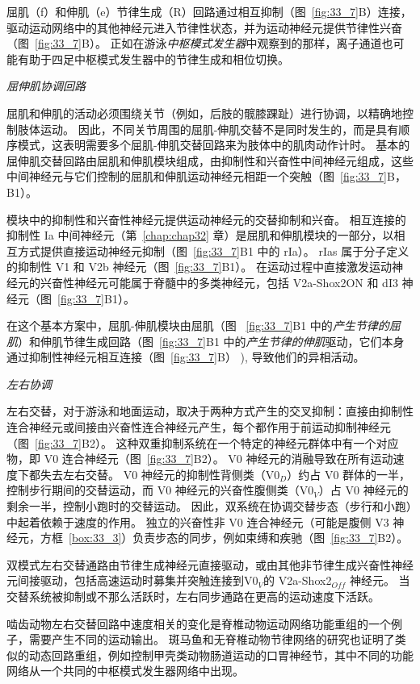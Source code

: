 屈肌（f）和伸肌（e）节律生成（R）回路通过相互抑制（图~\ref{fig:33_7}B）连接，驱动运动网络中的其他神经元进入节律性状态，并为运动神经元提供节律性兴奋（图~\ref{fig:33_7}B）。
正如在游泳\textit{中枢模式发生器}中观察到的那样，离子通道也可能有助于四足中枢模式发生器中的节律生成和相位切换。


\textit{屈伸肌协调回路}

屈肌和伸肌的活动必须围绕关节（例如，后肢的髋膝踝趾）进行协调，以精确地控制肢体运动。
因此，不同关节周围的屈肌-伸肌交替不是同时发生的，而是具有顺序模式，这表明需要多个屈肌-伸肌交替回路来为肢体中的肌肉动作计时。
基本的屈伸肌交替回路由屈肌和伸肌模块组成，由抑制性和兴奋性中间神经元组成，这些中间神经元与它们控制的屈肌和伸肌运动神经元相距一个突触（图~\ref{fig:33_7}B，B1）。


模块中的抑制性和兴奋性神经元提供运动神经元的交替抑制和兴奋。
相互连接的抑制性 Ia 中间神经元（第~\ref{chap:chap32} 章）是屈肌和伸肌模块的一部分，以相互方式提供直接运动神经元抑制（图~\ref{fig:33_7}B1 中的 rIa）。
rIas 属于分子定义的抑制性 V1 和 V2b 神经元（图~\ref{fig:33_7}B1）。
在运动过程中直接激发运动神经元的兴奋性神经元可能属于脊髓中的多类神经元，包括 V2a-Shox2ON 和 dI3 神经元（图~\ref{fig:33_7}B1）。


在这个基本方案中，屈肌-伸肌模块由屈肌（图 ~\ref{fig:33_7}B1 中的\textit{产生节律的屈肌}）和伸肌节律生成回路（图~\ref{fig:33_7}B1 中的\textit{产生节律的伸肌}驱动，它们本身通过抑制性神经元相互连接（图~\ref{fig:33_7}B） ), 导致他们的异相活动。


\textit{左右协调}

左右交替，对于游泳和地面运动，取决于两种方式产生的交叉抑制：直接由抑制性连合神经元或间接由兴奋性连合神经元产生，每个都作用于前运动抑制神经元（图~\ref{fig:33_7}B2）。
这种双重抑制系统在一个特定的神经元群体中有一个对应物，即 V0 连合神经元（图~\ref{fig:33_7}B2）。
V0 神经元的消融导致在所有运动速度下都失去左右交替。
V0 神经元的抑制性背侧类（V0$_D$）约占 V0 群体的一半，控制步行期间的交替运动，而 V0 神经元的兴奋性腹侧类（V0$_V$）占 V0 神经元的剩余一半，控制小跑时的交替运动。
因此，双系统在协调交替步态（步行和小跑）中起着依赖于速度的作用。
独立的兴奋性非 V0 连合神经元（可能是腹侧 V3 神经元，方框~\ref{box:33_3}）负责步态的同步，例如束缚和疾驰（图~\ref{fig:33_7}B2）。


双模式左右交替通路由节律生成神经元直接驱动，或由其他非节律生成兴奋性神经元间接驱动，包括高速运动时募集并突触连接到V0$_V$的 V2a-Shox2$_{Off}$ 神经元。
当交替系统被抑制或不那么活跃时，左右同步通路在更高的运动速度下活跃。


啮齿动物左右交替回路中速度相关的变化是脊椎动物运动网络功能重组的一个例子，需要产生不同的运动输出。
斑马鱼和无脊椎动物节律网络的研究也证明了类似的动态回路重组，例如控制甲壳类动物肠道运动的口胃神经节，其中不同的功能网络从一个共同的中枢模式发生器网络中出现。


